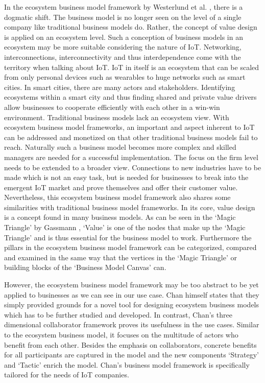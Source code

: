 		In the ecosystem business model framework by Westerlund et al. \cite{westerlund}, there is a dogmatic shift. The business model is no longer seen on the level of a single company like traditional business models do. Rather, the concept of value design is applied on an ecosystem level. Such a conception of business models in an ecosystem may be more suitable considering the nature of IoT. Networking, interconnections, interconnectivity and thus interdependence come with the territory when talking about IoT. IoT in itself is an ecosystem that can be scaled from only personal devices such as wearables to huge networks such as smart cities. In smart cities, there are many actors and stakeholders. Identifying ecosystems within a smart city and thus finding shared and private value drivers allow businesses to cooperate efficiently with each other in a win-win environment. Traditional business models lack an ecosystem view. With ecosystem business model frameworks, an important and aspect inherent to IoT can be addressed and monetized on that other traditional business models fail to reach. Naturally such a business model becomes more complex and skilled managers are needed for a successful implementation. The focus on the firm level needs to be extended to a broader view. Connections to new industries have to be made which is not an easy task, but is needed for businesses to break into the emergent IoT market and prove themselves and offer their customer value. Nevertheless, this ecosystem business model framework also shares some similarities with traditional business model frameworks. In its core, value design is a concept found in many business models. As can be seen in the `Magic Triangle' by Gassmann \cite{gassmann55}, `Value' is one of the nodes that make up the `Magic Triangle' and is thus essential for the business model to work. Furthermore the pillars in the ecosystem business model framework can be categorized, compared and examined in the same way that the vertices in the `Magic Triangle' or building blocks of the `Business Model Canvas' can.

		However, the ecosystem business model framework may be too abstract to be yet applied to businesses as we can see in our use case. Chan himself states that they simply provided grounds for a novel tool for designing ecosystem business models which has to be further studied and developed. In contrast, Chan's three dimensional collaborator framework proves its usefulness in the use cases. Similar to the ecosystem business model, it focuses on the multitude of actors who benefit from each other. Besides the emphasis on collaborators, concrete benefits for all participants are captured in the model and the new components `Strategy' and `Tactic' enrich the model. Chan's business model framework is specifically tailored for the needs of IoT companies.	
	
